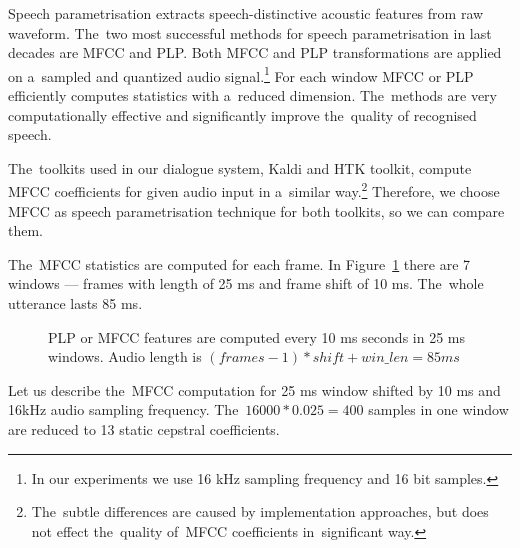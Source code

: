 Speech parametrisation extracts speech-distinctive acoustic features from raw waveform.
The~two most successful methods for speech parametrisation in last decades are \ac{MFCC}\cite{davis1980comparison} and \ac{PLP}\cite{hermansky1990perceptual}.
Both \ac{MFCC} and \ac{PLP} transformations are applied on a~sampled and quantized audio signal.\footnote{In our experiments we use 16 kHz sampling frequency and 16 bit samples.} 
For each window \ac{MFCC} or \ac{PLP} efficiently computes statistics with a~reduced dimension. 
The~methods are very computationally effective and significantly improve the~quality of recognised speech.

The~toolkits used in our dialogue system, Kaldi and \ac{HTK} toolkit, compute \ac{MFCC} coefficients for given audio input in a~similar way.\footnote{The~subtle differences are caused by implementation approaches, but does not effect the~quality of~\ac{MFCC} coefficients in~significant way.}
Therefore, we choose \ac{MFCC} as speech parametrisation technique for both toolkits, so we can compare them.


The~\ac{MFCC} statistics are computed for each frame.
In Figure~\ref{fig:mfcc_window} there are 7 windows --- frames with length of 25 ms and frame shift of 10 ms.
The~whole utterance lasts 85 ms.

\begin{figure}[!htp]
    \begin{center}
    
    \caption{\ac{PLP} or \ac{MFCC} features are computed every 10 ms seconds in 25 ms windows.
    Audio length is $(frames-1)*shift + win\_len = 85ms$}
    \label{fig:mfcc_window} 
    \end{center}
\end{figure}

Let us describe the~\ac{MFCC} computation for 25 ms window shifted by 10 ms and 16kHz audio sampling frequency. 
The~$16000 * 0.025 = 400$ samples in one window are reduced to 13 static cepstral coefficients.

